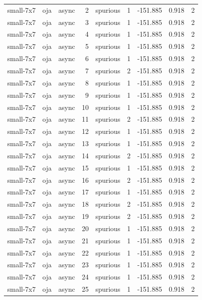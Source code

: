 \begin{tabular}{lllrlrrrr}
small-7x7 & oja & async & 2 & spurious & 1 & -151.885 & 0.918 & 2 \\
small-7x7 & oja & async & 3 & spurious & 1 & -151.885 & 0.918 & 2 \\
small-7x7 & oja & async & 4 & spurious & 1 & -151.885 & 0.918 & 2 \\
small-7x7 & oja & async & 5 & spurious & 1 & -151.885 & 0.918 & 2 \\
small-7x7 & oja & async & 6 & spurious & 1 & -151.885 & 0.918 & 2 \\
small-7x7 & oja & async & 7 & spurious & 2 & -151.885 & 0.918 & 2 \\
small-7x7 & oja & async & 8 & spurious & 1 & -151.885 & 0.918 & 2 \\
small-7x7 & oja & async & 9 & spurious & 1 & -151.885 & 0.918 & 2 \\
small-7x7 & oja & async & 10 & spurious & 1 & -151.885 & 0.918 & 2 \\
small-7x7 & oja & async & 11 & spurious & 2 & -151.885 & 0.918 & 2 \\
small-7x7 & oja & async & 12 & spurious & 1 & -151.885 & 0.918 & 2 \\
small-7x7 & oja & async & 13 & spurious & 1 & -151.885 & 0.918 & 2 \\
small-7x7 & oja & async & 14 & spurious & 2 & -151.885 & 0.918 & 2 \\
small-7x7 & oja & async & 15 & spurious & 1 & -151.885 & 0.918 & 2 \\
small-7x7 & oja & async & 16 & spurious & 2 & -151.885 & 0.918 & 2 \\
small-7x7 & oja & async & 17 & spurious & 1 & -151.885 & 0.918 & 2 \\
small-7x7 & oja & async & 18 & spurious & 2 & -151.885 & 0.918 & 2 \\
small-7x7 & oja & async & 19 & spurious & 2 & -151.885 & 0.918 & 2 \\
small-7x7 & oja & async & 20 & spurious & 1 & -151.885 & 0.918 & 2 \\
small-7x7 & oja & async & 21 & spurious & 1 & -151.885 & 0.918 & 2 \\
small-7x7 & oja & async & 22 & spurious & 1 & -151.885 & 0.918 & 2 \\
small-7x7 & oja & async & 23 & spurious & 1 & -151.885 & 0.918 & 2 \\
small-7x7 & oja & async & 24 & spurious & 1 & -151.885 & 0.918 & 2 \\
small-7x7 & oja & async & 25 & spurious & 1 & -151.885 & 0.918 & 2 \\

\end{tabular}
